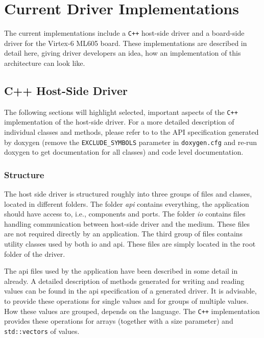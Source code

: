 \documentclass{report}
\begin{document}
\section{Current Driver Implementations}
\label{sec:impl}
The current implementations include a \texttt{C++} host-side driver and a board-side driver for the Virtex-6 ML605 board. These implementations are described in detail here, giving driver developers an idea, how an implementation of this architecture can look like. 


\subsection{C++ Host-Side Driver}
\label{sec:impl:cpp}
The following sections will highlight selected, important aspects of the \texttt{C++} implementation of the host-side driver. For a more detailed description of individual classes and methods, please refer to to the API specification generated by doxygen (remove the \texttt{EXCLUDE\_SYMBOLS} parameter in \texttt{doxygen.cfg} and re-run doxygen to get documentation for all classes) and code level documentation.

\subsubsection{Structure}
The host side driver is structured roughly into three groups of files and classes, located in different folders. The folder \textit{api} contains everything, the application should have access to, i.e., components and ports. The folder \textit{io} contains files handling communication between host-side driver and the medium. These files are not required directly by an application. The third group of files contains utility classes used by both io and api. These files are simply located in the root folder of the driver.

The api files used by the application have been described in some detail in  already. A detailed description of methods generated for writing and reading values can be found in the api specification of a generated driver. It is advisable, to provide these operations for single values and for groups of multiple values. How these values are grouped, depends on the language. The \texttt{C++} implementation provides these operations for arrays (together with a size parameter) and \texttt{std::vectors} of values.
\end{document}
